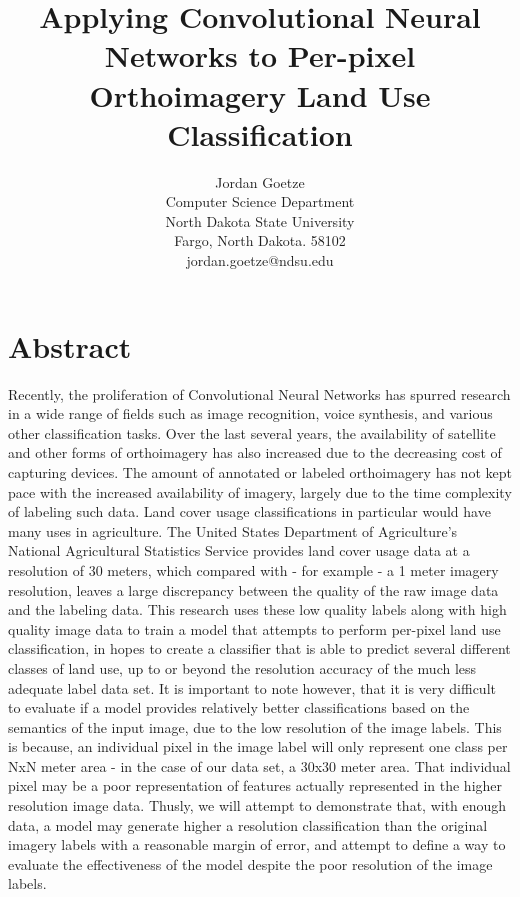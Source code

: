 \documentclass[12pt]{article}
\begin{document}
\title{Applying Convolutional Neural Networks to Per-pixel Orthoimagery Land Use Classification}

\author{
Jordan Goetze\\
Computer Science Department\\
North Dakota State University\\
Fargo, North Dakota. 58102\\
jordan.goetze@ndsu.edu
}
\date{} 

\maketitle
\thispagestyle{empty}

\section*{\centering Abstract}

Recently, the proliferation of Convolutional Neural Networks has spurred research in a wide range of fields such as image recognition, voice synthesis, and various other classification tasks. Over the last several years, the availability of satellite and other forms of orthoimagery has also increased due to the decreasing cost of capturing devices. The amount of annotated or labeled orthoimagery has not kept pace with the increased availability of imagery, largely due to the time complexity of labeling such data. Land cover usage classifications in particular would have many uses in agriculture. The United States Department of Agriculture's National Agricultural Statistics Service provides land cover usage data at a resolution of 30 meters, which compared with - for example - a 1 meter imagery resolution, leaves a large discrepancy between the quality of the raw image data and the labeling data. This research  uses these low quality labels along with high quality image data to train a model that attempts to perform per-pixel land use classification, in hopes to create a classifier that is able to predict several different classes of land use, up to or beyond the resolution accuracy of the much less adequate label data set. It is important to note however, that it is very difficult to evaluate if a model provides relatively better classifications based on the semantics of the input image, due to the low resolution of the image labels. This is because, an individual pixel in the image label will only represent one class per NxN meter area - in the case of our data set, a 30x30 meter area. That individual pixel may be a poor representation of features actually represented in the higher resolution image data. Thusly, we will attempt to demonstrate that, with enough data, a model may generate higher a resolution classification than the original imagery labels with a reasonable margin of error, and attempt to define a way to evaluate the effectiveness of the model despite the poor resolution of the image labels.
\end{document}
